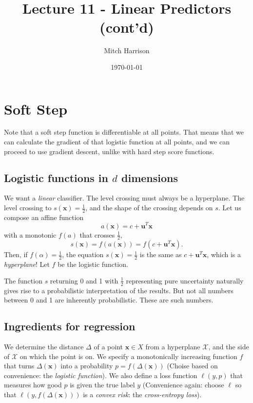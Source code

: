 \documentclass[titlepage, 12pt, leqno]{article}
\title{\Huge{Lecture 11 - Linear Predictors (cont'd)}}
\author{\large{Mitch Harrison}}
\date{\today}
\begin{document}
\setlength{\parskip}{1\baselineskip}
\setlength{\parindent}{15pt}
\maketitle
\tableofcontents
\newpage


\section{Soft Step}

Note that a soft step function is differentiable at all points. That means that
we can calculate the gradient of that logistic function at all points, and we can
proceed to use gradient descent, unlike with hard step score functions.

\subsection{Logistic functions in $d$ dimensions}
We want a \textit{linear} classifier. The level crossing must always be a
hyperplane. The level crossing to $s(\textbf{x}) = \frac{1}{2}$, and the shape of
the crossing depends on $s$. Let us compose an affine function 
\[
a(\textbf{x}) = c + \textbf{u}^{T}\textbf{x}
\]
with a monotonic $f(a)$ that crosses $\frac{1}{2}$,
\[
s(\textbf{x}) = f(a(\textbf{x})) = f(c+\textbf{u}^{T}\textbf{x}).
\]
Then, if $f(\alpha) = \frac{1}{2}$, the equation $s(\textbf{x}) = \frac{1}{2}$ is
the same as $c + \textbf{u}^{T}\textbf{x}$, which is a \textit{hyperplane}! Let
$f$ be the logistic function.

\begin{note}
    The function $s$ returning 0 and 1 with $\frac{1}{2}$ representing pure
    uncertainty naturally gives rise to a probabilistic interpretation of the
    results. But not all numbers between 0 and 1 are inherently probabilistic.
    These are such numbers. 
\end{note}

\subsection{Ingredients for regression}
We determine the distance $\Delta$ of a point $\textbf{x}\in X$ from a 
hyperplane $\mathcal{X}$, and the side of $\mathcal{X}$ on which the point is on.
We specify a monotonically increasing function $f$ that turns $\Delta(\textbf{x})$
into a probability $p = f(\Delta(\textbf{x}))$ (Choise based on convenience: the
\textit{logistic function}). We also define a loss function $\ell(y,p)$ that 
measures how good $p$ is given the true label $y$ (Convenience again: choose 
$\ell$ so that $\ell(y, f(\Delta(\textbf{x})))$ is a \textit{convex risk}: the
\textit{cross-entropy loss}).
\end{document}

